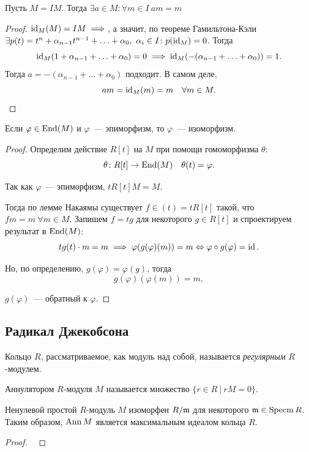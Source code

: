 	\begin{theorem}\label{Nakayama} 
		Пусть $M = IM$. Тогда $\exists a \in M\colon \forall m \in I \  am = m$
	\end{theorem}
	\begin{proof}
		$\operatorname{id}_{M}(M) = IM \implies $, а значит, по теореме Гамильтона-Кэли $\exists p(t) = t^n + \alpha_{n - 1}t^{n - 1} + \ldots + \alpha_0, \ \alpha_i \in I \colon p(\operatorname{id}_{M}) = 0$. Тогда 
		\[
			\operatorname{id}_{M}(1 + \alpha_{n - 1} + \ldots + \alpha_{0}) = 0 \implies \operatorname{id}_{M}(-(\alpha_{n - 1} + \ldots  + \alpha_0)) = 1.
		\]
		Тогда $a = -(\alpha_{n - 1} + \ldots  + \alpha_0)$ подходит. В самом деле, 
		\[
			am = \operatorname{id}_{M}(m) = m \quad \forall m \in M.
		\]
	\end{proof}

	\begin{corollary}
		Если $\varphi \in \operatorname{End}(M)$ и $\varphi$~--- эпиморфизм, то $\varphi$~--- изоморфизм. 
	\end{corollary}

	\begin{proof}
		Определим действие $R[t]$ на $M$ при помощи гомоморфизма $\theta$:
		\[
			\theta\colon R[t] \to \operatorname{End}(M) \quad \theta(t) = \varphi.
		\]

		Так как $\varphi$~--- эпиморфизм, $tR[t]M = M$. 

		Тогда по лемме Накаямы существует $f \in (t) = t R[t]$ такой, что $fm = m \ \forall m \in M$. Запишем $f = tg$ для некоторого $g \in R[t]$ и спроектируем результат в $\operatorname{End}(M)$:
		\[
			t g(t) \cdot m = m \implies \varphi(g(\varphi)(m)) = m \Leftrightarrow \varphi \circ g(\varphi) = \operatorname{id}.
		\]

		Но, по определению, $g(\varphi) = \varphi(g)$, тогда 
		\[
			g(\varphi)(\varphi(m)) = m,
		\]

		$g(\varphi)$~--- обратный к $\varphi$.
	\end{proof}

	\subsection{Радикал Джекобсона}

	Кольцо $R$, рассматриваемое, как модуль над собой, называется \emph{регулярным} $R$-модулем. 

	\begin{definition} 
		Аннулятором $R$-модуля $M$ называется множество $\{ r \in R \ \vert \ rM = 0 \}$.
	\end{definition}

	\begin{lemma} 
		Ненулевой простой $R$-модуль $M$ изоморфен $R/\mathfrak{m}$ для некоторого $\mathfrak{m} \in \operatorname{Specm}{R}$. Таким образом, $\operatorname{Ann}{M}$ является максимальным идеалом кольца $R$. 
	\end{lemma}

	\begin{proof} \ 
	\vspace{30mm}
	\end{proof}




	




